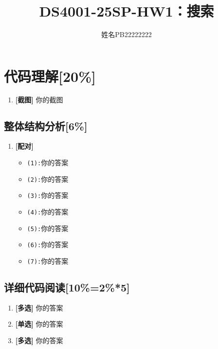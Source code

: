 \documentclass{article}
\title{\bfseries DS4001-25SP-HW1：搜索}
\author{姓名\quad PB22222222}
\begin{document}
\maketitle

\setcounter{section}{-1}
\section{代码理解[20\%]}

\begin{enumerate}[label=(\alph*)]
    \item \textbf{[截图]} %
    你的截图
\end{enumerate}


\subsection{整体结构分析[6\%]}

\begin{enumerate}[label=(\alph*), start=2]
    \item \textbf{[配对]} %
    \begin{itemize}
        \item \texttt{(1):}你的答案
        \item \texttt{(2):}你的答案
        \item \texttt{(3):}你的答案
        \item \texttt{(4):}你的答案
        \item \texttt{(5):}你的答案
        \item \texttt{(6):}你的答案
        \item \texttt{(7):}你的答案
    \end{itemize}
\end{enumerate}

\subsection{详细代码阅读[10\%=2\%*5]}

\begin{enumerate}[label=(\alph*), start=3]
    \item \textbf{[多选]} 你的答案 %
    \vspace{10pt}

    \item \textbf{[单选]} 你的答案 %
    \vspace{10pt}

    \item \textbf{[多选]} 你的答案 %
    \vspace{10pt}
\end{enumerate}
\end{document}
